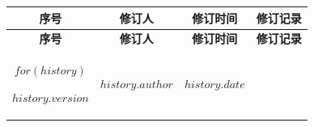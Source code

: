 \documentclass[
$if(fontsize)$
  $fontsize$,
$endif$
$if(papersize)$
  $papersize$paper,
$else$
  paper=a4,
$endif$
$if(beamer)$
  ignorenonframetext,
$if(handout)$
  handout,
$endif$
$if(aspectratio)$
  aspectratio=$aspectratio$,
$endif$
$endif$
$for(classoption)$
  $classoption$$sep$,
$endfor$
  ,captions=tableheading    %
]{$if(beamer)$$documentclass$$else$$if(book)$scrbook$else$scrartcl$endif$$endif$}
\begin{document}
\begin{longtable}[]{@{}cccl@{}}

        \toprule
        \begin{minipage}[b]{0.07\columnwidth}\centering
                \textbf{序号}\strut
        \end{minipage} & \begin{minipage}[b]{0.1\columnwidth}\centering
                                 \textbf{修订人}\strut
                         \end{minipage} & \begin{minipage}[b]{0.3\columnwidth}\centering
                                                  \textbf{修订时间}\strut
                                          \end{minipage} & \begin{minipage}[b]{0.43\columnwidth}\centering
                                                                   \textbf{修订记录}\strut
                                                           \end{minipage}\tabularnewline
        \midrule
        \endfirsthead
        \toprule
        \begin{minipage}[b]{0.07\columnwidth}\centering
                \textbf{序号}\strut
        \end{minipage} & \begin{minipage}[b]{0.1\columnwidth}\centering
                                 \textbf{修订人}\strut
                         \end{minipage} & \begin{minipage}[b]{0.3\columnwidth}\centering
                                                  \textbf{修订时间}\strut
                                          \end{minipage} & \begin{minipage}[b]{0.43\columnwidth}\centering
                                                                   \textbf{修订记录}\strut
                                                           \end{minipage}\tabularnewline
        \midrule
        \endhead

        $for(history)$

        \begin{minipage}[t]{0.07\columnwidth}\centering
                $history.version$\strut
        \end{minipage} & \begin{minipage}[t]{0.1\columnwidth}\centering
                                 $history.author$\strut
                         \end{minipage} & \begin{minipage}[t]{0.3\columnwidth}\centering
                                                  $history.date$\strut
                                          \end{minipage} & \begin{minipage}[t]{0.43\columnwidth}\raggedright


\end{minipage}
\end{longtable}
\end{document}
